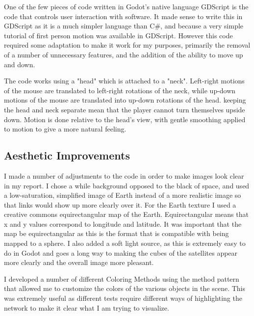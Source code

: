 \documentclass[12pt]{report}
\begin{document}
One of the few pieces of code written in Godot's native language GDScript is the code that controls user interaction with software. It made sense to write this in GDScript as it is a much simpler language than C\#, and because a very simple tutorial of first person motion was available in GDScript\cite{FirstPersonMotion}. However this code required some adaptation to make it work for my purposes, primarily the removal of a number of unnecessary features, and the addition of the ability to move up and down.

The code works using a "head" which is attached to a "neck". Left-right motions of the mouse are translated to left-right rotations of the neck, while up-down motions of the mouse are translated into up-down rotations of the head. keeping the head and neck separate mean that the player cannot turn themselves upside down. Motion is done relative to the head's view, with gentle smoothing applied to motion to give a more natural feeling.

\subsection{Aesthetic Improvements}
I made a number of adjustments to the code in order to make images look clear in my report. I chose a while background opposed to the black of space, and used a low-saturation, simplified image of Earth instead of a more realistic image so that links would show up more clearly over it. For the Earth texture I used a creative commons equirectangular map of the Earth. Equirectangular means that x and y values correspond to longitude and latitude. It was important that the map be equirectangular as this is the format that is compatible with being mapped to a sphere. \cite{Map} I also added a soft light source, as this is extremely easy to do in Godot and goes a long way to making the cubes of the satellites appear more clearly and the overall image more pleasant.

I developed a number of different Coloring Methods using the method pattern that allowed me to customize the colors of the various objects in the scene. This was extremely useful as different tests require different ways of highlighting the network to make it clear what I am trying to visualize.

\end{document}
